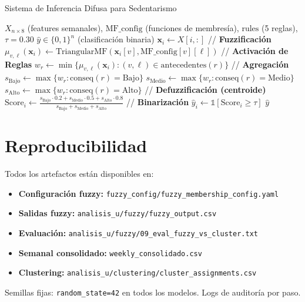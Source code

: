 \documentclass[12pt,a4paper,twoside]{article}
\begin{document}
\begin{algorithm}
\caption{Sistema de Inferencia Difusa para Sedentarismo}
\begin{algorithmic}[1]
\Require $X_{n \times 8}$ (features semanales), $\text{MF\_config}$ (funciones de membresía), $\text{rules}$ (5 reglas), $\tau=0.30$
\Ensure $\hat{y} \in \{0,1\}^n$ (clasificación binaria)
    \State $\mathbf{x}_i \gets X[i, :]$ 
    \State // \textbf{Fuzzificación}
            \State $\mu_{v,\ell}(\mathbf{x}_i) \gets \text{TriangularMF}(\mathbf{x}_i[v], \text{MF\_config}[v][\ell])$
        \EndFor
    \EndFor
    \State // \textbf{Activación de Reglas}
        \State $w_r \gets \min\{\mu_{v,\ell}(\mathbf{x}_i) : (v,\ell) \in \text{antecedentes}(r)\}$ 
    \EndFor
    \State // \textbf{Agregación}
    \State $s_{\text{Bajo}} \gets \max\{w_r : \text{conseq}(r) = \text{Bajo}\}$ 
    \State $s_{\text{Medio}} \gets \max\{w_r : \text{conseq}(r) = \text{Medio}\}$
    \State $s_{\text{Alto}} \gets \max\{w_r : \text{conseq}(r) = \text{Alto}\}$
    \State // \textbf{Defuzzificación (centroide)}
    \State $\text{Score}_i \gets \frac{s_{\text{Bajo}} \cdot 0.2 + s_{\text{Medio}} \cdot 0.5 + s_{\text{Alto}} \cdot 0.8}{s_{\text{Bajo}} + s_{\text{Medio}} + s_{\text{Alto}}}$
    \State // \textbf{Binarización}
    \State $\hat{y}_i \gets \mathbb{1}[\text{Score}_i \geq \tau]$
\EndFor
\State \Return $\hat{y}$
\end{algorithmic}
\end{algorithm}

\section{Reproducibilidad}

Todos los artefactos están disponibles en:
\begin{itemize}
    \item \textbf{Configuración fuzzy:} \texttt{fuzzy\_config/fuzzy\_membership\_config.yaml}
    \item \textbf{Salidas fuzzy:} \texttt{analisis\_u/fuzzy/fuzzy\_output.csv}
    \item \textbf{Evaluación:} \texttt{analisis\_u/fuzzy/09\_eval\_fuzzy\_vs\_cluster.txt}
    \item \textbf{Semanal consolidado:} \texttt{weekly\_consolidado.csv}
    \item \textbf{Clustering:} \texttt{analisis\_u/clustering/cluster\_assignments.csv}
\end{itemize}

Semillas fijas: \texttt{random\_state=42} en todos los modelos. Logs de auditoría por paso.
\end{document}
